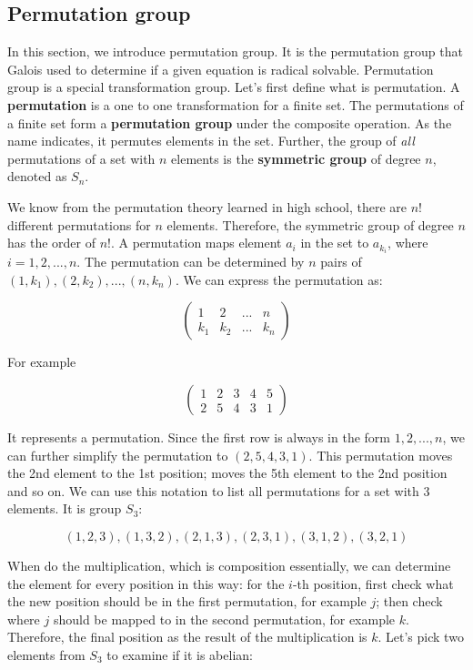 \documentclass[b5paper]{article}
\begin{document}
\subsection{Permutation group}
\label{permutation group}
\label{symmetric group}

In this section, we introduce permutation group. It is the permutation group that Galois used to determine if a given equation is radical solvable. Permutation group is a special transformation group. Let's first define what is permutation. A \textbf{permutation} is a one to one transformation for a finite set. The permutations of a finite set form a \textbf{permutation group} under the composite operation. As the name indicates, it permutes elements in the set. Further, the group of {\em all} permutations of a set with $n$ elements is the \textbf{symmetric group} of degree $n$, denoted as $S_n$.

We know from the permutation theory learned in high school, there are $n!$ different permutations for $n$ elements. Therefore, the symmetric group of degree $n$ has the order of $n!$. A permutation maps element $a_i$ in the set to $a_{k_i}$, where $i = 1, 2, ..., n$. The permutation can be determined by $n$ pairs of $(1, k_1), (2, k_2), ..., (n, k_n)$. We can express the permutation as:

\[
\begin{pmatrix}
1 & 2 & ... & n \\
k_1 & k_2 & ... & k_n
\end{pmatrix}
\]

For example

\[
\begin{pmatrix}
1 & 2 & 3 & 4 & 5 \\
2 & 5 & 4 & 3 & 1
\end{pmatrix}
\]

It represents a permutation. Since the first row is always in the form $1, 2, ..., n$, we can further simplify the permutation to $(2, 5, 4, 3, 1)$. This permutation moves the 2nd element to the 1st position; moves the 5th element to the 2nd position and so on. We can use this notation to list all permutations for a set with 3 elements. It is group $S_3$:

\[
(1, 2, 3), (1, 3, 2), (2, 1, 3), (2, 3, 1), (3, 1, 2), (3, 2, 1)
\]

When do the multiplication, which is composition essentially, we can determine the element for every position in this way: for the $i$-th position, first check what the new position should be in the first permutation, for example $j$; then check where $j$ should be mapped to in the second permutation, for example $k$. Therefore, the final position as the result of the multiplication is $k$. Let's pick two elements from $S_3$ to examine if it is abelian:
\end{document}
